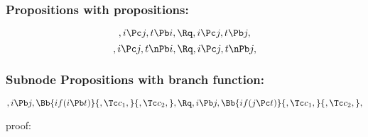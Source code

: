 \bigskip
\bigskip
\bigskip
\bigskip
\subsubsection{Propositions with propositions:}
\[,i \Pc j, t \Pb i, \Rq , i \Pc j, t \Pb j,\]
\[,i \Pc j, t \nPb i, \Rq , i \Pc j, t \nPb j,\]



\bigskip
\bigskip
\subsubsection{Subnode Propositions with branch function:}
\[,i \Pb j, \Bb{if(i \Pb t)}{,\Tc c_1,}{,\Tc c_2,}, \Rq ,i \Pb j, \Bb{if(j \Pc t)}{,\Tc c_1,}{,\Tc c_2,}, \]


\bigskip
\bigskip
proof:\\
